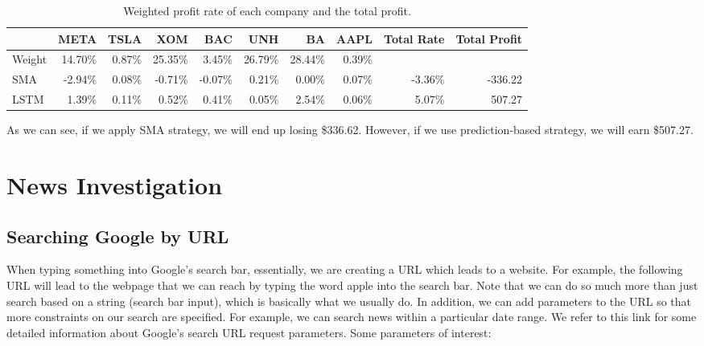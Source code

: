 \documentclass[a4paper, 11pt]{my-elegantpaper}
\begin{document}
\begin{table}[H]
    \centering
    \begin{tabular}{lrrrrrrr rr}
        \toprule
        {} &   META &  TSLA &    XOM &    BAC &    UNH &     BA &  AAPL & Total Rate & Total Profit\\
        \midrule
        Weight        & 14.70\% & 0.87\% & 25.35\% &  3.45\% & 26.79\% & 28.44\% & 0.39\% \\
        SMA  & -2.94\% & 0.08\% & -0.71\% & -0.07\% &  0.21\% &  0.00\% & 0.07\% & -3.36\% & -336.22 \\
        LSTM &  1.39\% & 0.11\% &  0.52\% &  0.41\% &  0.05\% &  2.54\% & 0.06\% &  5.07\% & 507.27\\
        \bottomrule
    \end{tabular}
    \caption{Weighted profit rate of each company and the total profit.}
    \label{tab:4}
\end{table}

As we can see, if we apply SMA strategy, we will end up losing \$336.62. However, if we use prediction-based strategy, we will earn \$507.27.


\section{News Investigation} \label{sec:4}


\subsection{Searching Google by URL}

When typing something into Google's search bar, essentially, we are creating a URL which leads to a website. For example, the following URL will lead to the webpage that we can reach by typing the word apple into the search bar. Note that we can do so much more than just search based on a string (search bar input), which is basically what we usually do. In addition, we can add parameters to the URL so that more constraints on our search are specified. For example, we can search news within a particular date range.
We refer to this link\cite{stenevang-2016} for some detailed information about Google's search URL request parameters.
Some parameters of interest:
\end{document}
